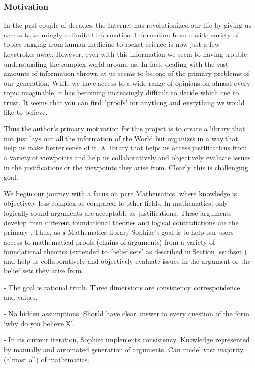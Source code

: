 \documentclass[a4paper]{article}
\begin{document}
\subsubsection*{Motivation}

In the past couple of decades, the Internet has revolutionized our life by giving us access to seemingly unlimited information. Information from a wide variety of topics ranging from human medicine to rocket science is now just a few keystrokes away. However, even with this information we seem to having trouble understanding the complex world around us. In fact, dealing with the vast amounts of information thrown at us seems to be one of the primary problems of our generation. While we have access to a wide range of opinions on almost every topic imaginable, it has becoming increasingly difficult to decide which one to trust. It seems that you can find "proofs" for anything and everything we would like to believe.

Thus the author's primary motivation for this project is to create a library that not just lays out all the information of the World but organizes in a way that help us make better sense of it. A library that helps us access justifications from a variety of viewpoints and help us collaboratively and objectively evaluate issues in the justifications or the viewpoints they arise from. Clearly, this is challenging goal. 

We begin our journey with a focus on pure Mathematics, where knowledge is objectively less complex as compared to other fields. In mathematics, only logically sound arguments are acceptable as justifications. These arguments develop from different foundational theories and logical contradictions are the primary . Thus, as a Mathematics library Sophize's goal is to help our users access to mathematical proofs (chains of arguments) from a variety of foundational theories (extended to 'belief sets' as described in Section \ref{sec:bset}) and help us collaboratively and objectively evaluate issues in the argument or the belief sets they arise from.




- The goal is rational truth. Three dimensions are consistency, correspondence and values.

- No hidden assumptions. Should have clear answer to every question of the form `why do you believe X'.

- In its current iteration, Sophize implements consistency. Knowledge represented by manually and automated generation of arguments. Can model vast majority (almost all) of mathematics.
\end{document}
